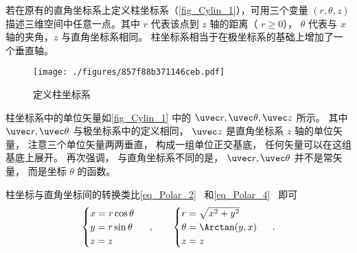 
若在原有的直角坐标系上定义柱坐标系（\autoref{fig_Cylin_1}），可用三个变量 $(r, \theta, z)$ 描述三维空间中任意一点。其中 $r$ 代表该点到 $z$ 轴的距离（ $r \geqslant 0$）， $\theta$ 代表与 $x$ 轴的夹角，$z$ 与直角坐标系相同。 柱坐标系相当于在极坐标系的基础上增加了一个垂直轴。

\begin{figure}[ht]
\centering
\texttt{[image: ./figures/857f88b371146ceb.pdf]}
\caption{定义柱坐标系}\label{fig_Cylin_1}
\end{figure}

柱坐标系中的单位矢量如\autoref{fig_Cylin_1} 中的 $\uvec r,\uvec \theta ,\uvec z$ 所示。 其中 $\uvec r, \uvec \theta$ 与极坐标系中的定义相同， $\uvec z$ 是直角坐标系 $z$ 轴的单位矢量， 注意三个单位矢量两两垂直， 构成一组单位正交基底， 任何矢量可以在这组基底上展开。 再次强调， 与直角坐标系不同的是， $\uvec r, \uvec \theta$ 并不是常矢量， 而是坐标 $\theta$ 的函数。

柱坐标与直角坐标间的转换类比\autoref{eq_Polar_2}~ 和\autoref{eq_Polar_4}~ 即可
\begin{equation}
\begin{cases}
x = r\cos \theta \\
y = r\sin \theta \\
z = z
\end{cases}~,
\qquad
\begin{cases}
r = \sqrt {x^2 + y^2} \\
\theta  = \Arctan(y, x)\\
z = z
\end{cases}~.
\end{equation}
